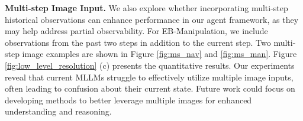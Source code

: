 \textbf{Multi-step Image Input.} We also explore whether incorporating multi-step historical observations can enhance performance in our agent framework, as they may help address partial observability. For EB-Manipulation, we include observations from the past two steps in addition to the current step. Two multi-step image examples are shown in Figure \ref{fig:ms_nav} and \ref{fig:ms_man}. Figure \ref{fig:low_level_resolution} (c) presents the quantitative results. Our experiments reveal that current MLLMs struggle to effectively utilize multiple image inputs, often leading to confusion about their current state. Future work could focus on developing methods to better leverage multiple images for enhanced understanding and reasoning.





